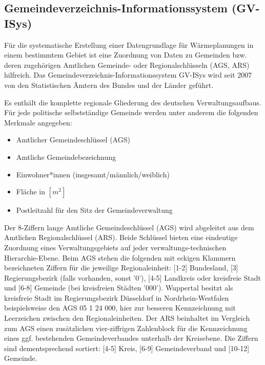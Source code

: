 		\subsection{Gemeindeverzeichnis-Informationssystem (GV-ISys)}
		\label{sec:Daten:Datensatz:GV-ISys}	
			Für die systematische Erstellung einer Datengrundlage für Wärmeplanungen in einem bestimmtem Gebiet ist eine Zuordnung von Daten zu Gemeinden bzw. deren zugehörigen Amtlichen Gemeinde- oder Regionalschlüsseln (AGS, ARS) hilfreich. Das Gemeindeverzeichnis-Informationssystem GV-ISys wird seit 2007 von den Statistischen Ämtern des Bundes und der Länder geführt.
			
			 Es enthält die komplette regionale Gliederung des deutschen Verwaltungsaufbaus. Für jede politische selbstständige Gemeinde werden unter anderem die folgenden Merkmale angegeben\cite{gv_isys_verzeichnis_definitionen_beschreibungen}:\\
			
			\begin{itemize}
				\item Amtlicher Gemeindeschlüssel (AGS)
				\item Amtliche Gemeindebezeichnung
				\item Einwohner*innen (insgesamt/männlich/weiblich)
				\item Fläche in $[m^2]$
				\item Postleitzahl für den Sitz der Gemeindeverwaltung
			\end{itemize}
		
			Der 8-Ziffern lange Amtliche Gemeindeschlüssel (AGS) wird abgeleitet aus dem Amtlichen Regionalschlüssel (ARS). Beide Schlüssel bieten eine eindeutige Zuordnung eines Verwaltungsgebiets auf jeder verwaltungs-technischen Hierarchie-Ebene. Beim AGS stehen die folgenden mit eckigen Klammern bezeichneten Ziffern für die jeweilige Regionaleinheit: [1-2] Bundesland, [3] Regierungsbezirk (falls vorhanden, sonst '0'), [4-5] Landkreis oder kreisfreie Stadt und [6-8] Gemeinde (bei kreisfreien Städten '000'). Wuppertal besitzt als kreisfreie Stadt im Regierungsbezirk Düsseldorf in Nordrhein-Westfalen beispielsweise den AGS 05 1 24 000, hier zur besseren Kennzeichnung mit Leerzeichen zwischen den Regionaleinheiten. Der ARS beinhaltet im Vergleich zum AGS einen zusätzlichen vier-ziffrigen Zahlenblock für die Kennzeichnung eines ggf. bestehenden Gemeindeverbandes unterhalb der Kreisebene. Die Ziffern sind dementsprechend sortiert: [4-5] Kreis, [6-9] Gemeindeverband und [10-12] Gemeinde. \cite{web_glossar_ags}\cite{web_glossar_ars}
			
